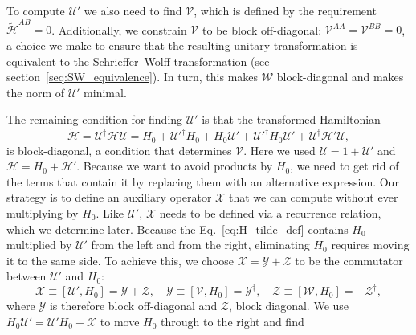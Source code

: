 To compute $\mathcal{U}'$ we also need to find $\mathcal{V}$, which is defined
by the requirement $\tilde{\mathcal{H}}^{AB} = 0$.
Additionally, we constrain $\mathcal{V}$ to be block off-diagonal:
$\mathcal{V}^{AA} = \mathcal{V}^{BB} = 0$, a choice we make to ensure that the
resulting unitary transformation is equivalent to the Schrieffer--Wolff
transformation (see section~\ref{seq:SW_equivalence}).
In turn, this makes $\mathcal{W}$ block-diagonal and makes the norm
of $\mathcal{U}'$ minimal.

The remaining condition for finding $\mathcal{U}'$ is that the transformed
Hamiltonian
%
\begin{equation}
\label{eq:H_tilde_def}
\tilde{\mathcal{H}} = \mathcal{U}^\dagger \mathcal{H} \mathcal{U} = H_0 +
\mathcal{U}'^\dagger H_0 + H_0 \mathcal{U}' + \mathcal{U}'^\dagger H_0
\mathcal{U}' + \mathcal{U}^\dagger\mathcal{H'}\mathcal{U},
\end{equation}
%
is block-diagonal, a condition that determines $\mathcal{V}$.
Here we used $\mathcal{U}=1+\mathcal{U}'$ and $\mathcal{H} = H_0 + \mathcal{H'}$.
Because we want to avoid products by $H_0$, we need to get rid of the terms
that contain it by replacing them with an alternative expression.
Our strategy is to define an auxiliary operator $\mathcal{X}$ that we can
compute without ever multiplying by $H_0$.
Like $\mathcal{U}'$, $\mathcal{X}$ needs to be defined via a recurrence
relation, which we determine later.
Because the Eq.~\eqref{eq:H_tilde_def} contains $H_0$ multiplied by
$\mathcal{U}'$ from the left and from the right, eliminating $H_0$ requires
moving it to the same side.
To achieve this, we choose $\mathcal{X}=\mathcal{Y}+\mathcal{Z}$ to be the commutator between
$\mathcal{U}'$ and $H_0$:
%
\begin{equation}
\label{eq:XYZ}
\mathcal{X} \equiv [\mathcal{U}', H_0] = \mathcal{Y} + \mathcal{Z}, \quad
\mathcal{Y} \equiv [\mathcal{V}, H_0] = \mathcal{Y}^\dagger,\quad
\mathcal{Z} \equiv [\mathcal{W}, H_0] = -\mathcal{Z}^\dagger,
\end{equation}
%
where $\mathcal{Y}$ is therefore block off-diagonal and $\mathcal{Z}$, block
diagonal.
We use $H_0 \mathcal{U}' = \mathcal{U}' H_0 -\mathcal{X}$ to move $H_0$ through
to the right and find
%
